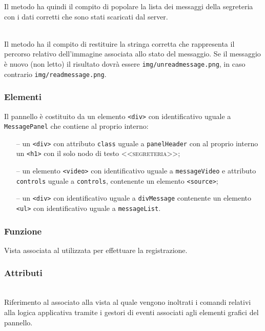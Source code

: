 \begin{description}
  Il metodo ha quindi il compito di popolare la lista dei messaggi della segreteria con i dati corretti che sono stati scaricati dal server.
  
  \item{}\\
  Il metodo ha il compito di restituire la stringa corretta che rappresenta il percorso relativo dell'immagine associata allo stato del messaggio. Se il messaggio è nuovo (non letto) il risultato dovrà essere \verb'img/unreadmessage.png', in caso contrario  \verb'img/readmessage.png'.
  
\end{description}

\subsubsection*{Elementi}
Il pannello è costituito da un elemento \verb'<div>' con identificativo uguale a \verb'MessagePanel' che contiene al proprio interno:
\begin{itemize}
  \item[--] un \verb'<div>' con attributo \verb'class' uguale a \verb'panelHeader' con al proprio interno un \verb'<h1>' con il solo nodo di testo \textsc{<<segreteria>>};
  \item[--] un elemento \verb'<video>' con identificativo uguale a \verb'messageVideo' e attributo \verb'controls' uguale a \verb'controls', contenente un elemento \verb'<source>';
  \item[--] un \verb'<div>' con identificativo uguale a \verb'divMessage' contenente un elemento \verb'<ul>' con identificativo uguale a \verb'messageList'.
\end{itemize}


\subsubsection*{Funzione}
Vista associata al   utilizzata per effettuare la registrazione.

\subsubsection*{Attributi}
\begin{description}
  \item{}\\
  Riferimento al  associato alla vista al quale vengono inoltrati i comandi relativi alla logica applicativa tramite i gestori di eventi associati agli elementi grafici del pannello.
\end{description}


